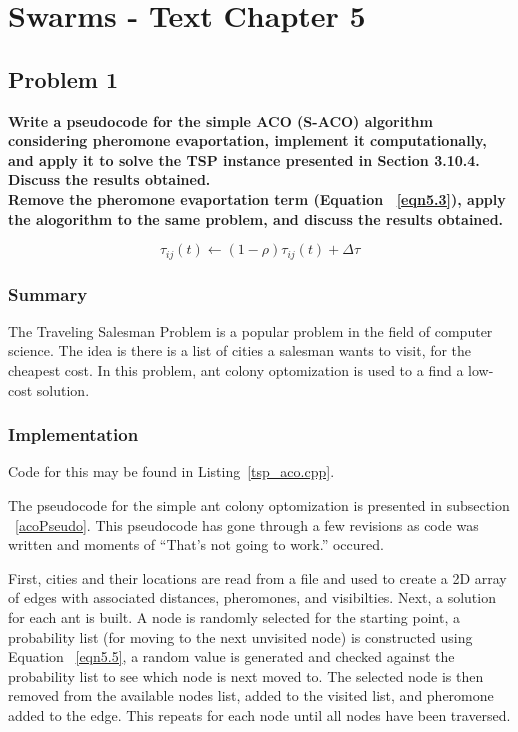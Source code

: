 
\chapter{Swarms - Text Chapter 5}

\section{ Problem 1 }
\textbf{Write a pseudocode for the simple ACO (S-ACO) algorithm considering pheromone evaportation, implement it computationally, and apply it to solve the TSP instance presented in Section 3.10.4. Discuss the results obtained.} \newline \\
\textbf{Remove the pheromone evaportation term (Equation ~\ref{eqn5.3}), apply the alogorithm to the same problem, and discuss the results obtained.}

\begin{equation} \label{eqn5.3}
\tau_{ij}(t) \leftarrow ( 1-\rho ) \tau_{ij}(t) + \Delta \tau
\end{equation}


\subsection{Summary}
The Traveling Salesman Problem is a popular problem in the field of computer science. The idea is there is a list of cities a salesman wants to visit, for the cheapest cost. In this problem, ant colony optomization is used to a find a low-cost solution.

\subsection{Implementation}
Code for this may be found in Listing~\ref{tsp_aco.cpp}.

The pseudocode for the simple ant colony optomization is presented in subsection ~\ref{acoPseudo}. This pseudocode has gone through a few revisions as code was written and moments of ``That's not going to work.'' occured. 

First, cities and their locations are read from a file and used to create a 2D array of edges with associated distances, pheromones, and visibilties. Next, a solution for each ant is built. A node is randomly selected for the starting point, a probability list (for moving to the next unvisited node) is constructed using Equation ~\ref{eqn5.5}, a random value is generated and checked against the probability list to see which node is next moved to. The selected node is then removed from the available nodes list, added to the visited list, and pheromone added to the edge. This repeats for each node until all nodes have been traversed.

